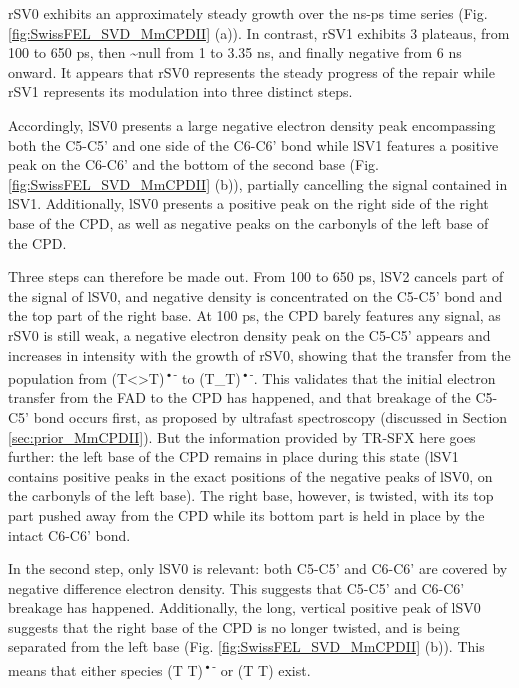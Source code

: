 rSV0 exhibits an approximately steady growth over the ns-ps time series (Fig. \ref{fig:SwissFEL_SVD_MmCPDII} (a)). In contrast, rSV1 exhibits 3 plateaus, from 100 to  650 ps, then \textasciitilde null from 1 to 3.35 ns, and finally negative from 6 ns onward. It appears that rSV0 represents the steady progress of the repair while rSV1 represents its modulation into three distinct steps. 

Accordingly, lSV0 presents a large negative electron density peak encompassing both the C5-C5' and one side of the C6-C6' bond while lSV1 features a positive peak on the C6-C6' and the bottom of the second base (Fig. \ref{fig:SwissFEL_SVD_MmCPDII} (b)), partially cancelling the signal contained in lSV1. Additionally, lSV0 presents a positive peak on the right side of the right base of the CPD, as well as negative peaks on the carbonyls of the left base of the CPD. 

Three steps can therefore be made out. From 100 to 650 ps, lSV2 cancels part of the signal of lSV0, and negative density is concentrated on the C5-C5' bond and the top part of the right base. At 100 ps, the CPD barely features any signal, as rSV0 is still weak, a negative electron density peak on the C5-C5' appears and increases in intensity with the growth of rSV0, showing that the transfer from the population from (T<>T)\textsuperscript{•-} to (T\_T)\textsuperscript{•-}. This validates that the initial electron transfer from the FAD to the CPD has happened, and that breakage of the C5-C5' bond occurs first, as proposed by ultrafast spectroscopy (discussed in Section \ref{sec:prior_MmCPDII}). But the information provided by TR-SFX here goes further: the left base of the CPD remains in place during this state (lSV1 contains positive peaks in the exact positions of the negative peaks of lSV0, on the carbonyls of the left base). The right base, however, is twisted, with its top part pushed away from the CPD while its bottom part is held in place by the intact C6-C6' bond. 

In the second step, only lSV0 is relevant: both C5-C5' and C6-C6' are covered by negative difference electron density. This suggests that C5-C5' and C6-C6' breakage has happened. Additionally, the long, vertical positive peak of lSV0 suggests that the right base of the CPD is no longer twisted, and is being separated from the left base (Fig. \ref{fig:SwissFEL_SVD_MmCPDII} (b)). This means that either species (T T)\textsuperscript{•-} or (T T) exist. 

